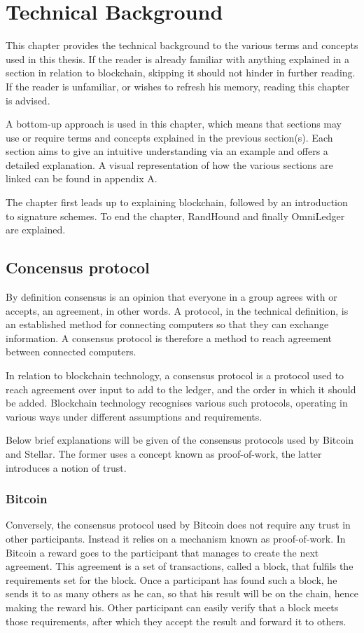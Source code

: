 \chapter{Technical Background}
This chapter provides the technical background to the various terms and concepts used in this thesis. If the reader is already familiar with anything explained in a section in relation to blockchain, skipping it should not hinder in further reading. If the reader is unfamiliar, or wishes to refresh his memory, reading this chapter is advised.

A bottom-up approach is used in this chapter, which means that sections may use or require terms and concepts explained in the previous section(s). Each section aims to give an intuitive understanding via an example and offers a detailed explanation. A visual representation of how the various sections are linked can be found in appendix A.

The chapter first leads up to explaining blockchain, followed by an introduction to signature schemes. To end the chapter, RandHound and finally OmniLedger are explained.

\section{Concensus protocol} \label{Consensus}
By definition consensus is an opinion that everyone in a group agrees with or accepts, an agreement, in other words. A protocol, in the technical definition, is an established method for connecting computers so that they can exchange information. A consensus protocol is therefore a method to reach agreement between connected computers.

In relation to blockchain technology, a consensus protocol \cite{IBMConsensus} is a protocol used to reach agreement over input to add to the ledger, and the order in which it should be added. Blockchain technology recognises various such protocols, operating in various ways under different assumptions and requirements.

Below brief explanations will be given of the consensus protocols used by Bitcoin and Stellar. The former uses a concept known as proof-of-work, the latter introduces a notion of trust.

\subsection{Bitcoin}
Conversely, the consensus protocol used by Bitcoin \cite{Bitcoin} does not require any trust in other participants. Instead it relies on a mechanism known as proof-of-work. In Bitcoin a reward goes to the participant that manages to create the next agreement. This agreement is a set of transactions, called a block, that fulfils the requirements set for the block. Once a participant has found such a block, he sends it to as many others as he can, so that his result will be on the chain, hence making the reward his. Other participant can easily verify that a block meets those requirements, after which they accept the result and forward it to others.

